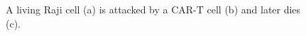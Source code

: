 \begin{figure}[h]%
    \centering
    \qquad
    \qquad
    \caption{A living Raji cell (a) is attacked by a CAR-T cell (b) and later dies (c).}%
    \label{fig:t_cell_latch}
\end{figure}

